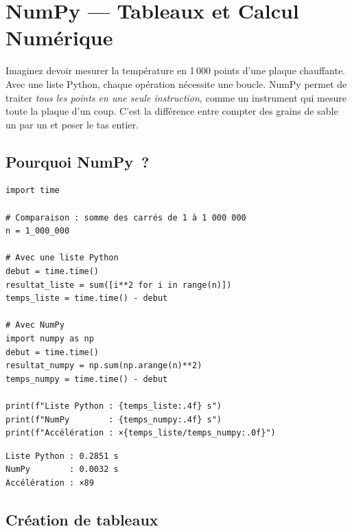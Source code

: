 \chapter{NumPy --- Tableaux et Calcul Num\'erique}
\label{ch:numpy}

\begin{intuition}
Imaginez devoir mesurer la temp\'erature en 1\,000 points d'une plaque chauffante.
Avec une liste Python, chaque op\'eration n\'ecessite une boucle. NumPy
permet de traiter \emph{tous les points en une seule instruction}, comme un instrument
qui mesure toute la plaque d'un coup. C'est la diff\'erence entre compter des grains
de sable un par un et peser le tas entier.
\end{intuition}

\section{Pourquoi NumPy~?}

\begin{codeblock}[title=\textbf{Python}]
\begin{verbatim}
import time

# Comparaison : somme des carrés de 1 à 1 000 000
n = 1_000_000

# Avec une liste Python
debut = time.time()
resultat_liste = sum([i**2 for i in range(n)])
temps_liste = time.time() - debut

# Avec NumPy
import numpy as np
debut = time.time()
resultat_numpy = np.sum(np.arange(n)**2)
temps_numpy = time.time() - debut

print(f"Liste Python : {temps_liste:.4f} s")
print(f"NumPy        : {temps_numpy:.4f} s")
print(f"Accélération : ×{temps_liste/temps_numpy:.0f}")
\end{verbatim}
\end{codeblock}

\begin{codeoutput}
\begin{verbatim}
Liste Python : 0.2851 s
NumPy        : 0.0032 s
Accélération : ×89
\end{verbatim}
\end{codeoutput}

\section{Cr\'eation de tableaux}


